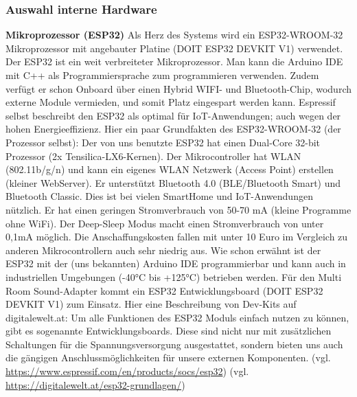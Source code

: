 \documentclass[]{article}
\begin{document}
\subsubsection{Auswahl interne Hardware}
\textbf{Mikroprozessor (ESP32)}\newline
Als Herz des Systems wird ein ESP32-WROOM-32 Mikroprozessor mit angebauter Platine (DOIT ESP32 DEVKIT V1) verwendet. Der ESP32 ist ein weit verbreiteter Mikroprozessor. Man kann die Arduino IDE mit C++ als Programmiersprache zum programmieren verwenden. Zudem verfügt er schon Onboard über einen Hybrid WIFI- und Bluetooth-Chip, wodurch externe Module vermieden, und somit Platz eingespart werden kann. Espressif selbst beschreibt den ESP32 als optimal für IoT-Anwendungen; auch wegen der hohen Energieeffizienz.\newline
Hier ein paar Grundfakten des ESP32-WROOM-32 (der Prozessor selbst):\newline
Der von uns benutzte ESP32 hat einen Dual-Core 32-bit Prozessor (2x Tensilica-LX6-Kernen). Der Mikrocontroller hat WLAN (802.11b/g/n) und kann ein eigenes WLAN Netzwerk (Access Point) erstellen (kleiner WebServer). Er unterstützt Bluetooth 4.0 (BLE/Bluetooth Smart) und Bluetooth Classic. Dies ist bei vielen SmartHome und IoT-Anwendungen nützlich. Er hat einen geringen Stromverbrauch von 50-70 mA (kleine Programme ohne WiFi). Der Deep-Sleep Modus macht einen Stromverbrauch von unter 0,1mA möglich. Die Anschaffungskosten fallen mit unter 10 Euro im Vergleich zu anderen Mikrocontrollern auch sehr niedrig aus.\newline
Wie schon erwähnt ist der ESP32 mit der (uns bekannten) Arduino IDE programmierbar und kann auch in industriellen Umgebungen (-40°C bis +125°C) betrieben werden.\newline
Für den Multi Room Sound-Adapter kommt ein ESP32 Entwicklungsboard (DOIT ESP32 DEVKIT V1) zum Einsatz.\newline
Hier eine Beschreibung von Dev-Kits auf digitalewelt.at: \glqq Um alle Funktionen des ESP32 Moduls einfach nutzen zu können, gibt es sogenannte Entwicklungsboards. Diese sind nicht nur mit zusätzlichen Schaltungen für die Spannungsversorgung ausgestattet, sondern bieten uns auch die gängigen Anschlussmöglichkeiten für unsere externen Komponenten.\grqq{}
\vspace{4mm} \newline
(vgl. \url{https://www.espressif.com/en/products/socs/esp32}) \newline
(vgl. \url {https://digitalewelt.at/esp32-grundlagen/})
\end{document}
